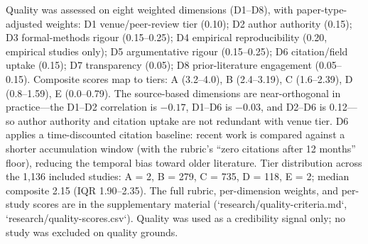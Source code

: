 Quality was assessed on eight weighted dimensions (D1--D8), with paper-type-adjusted weights: D1 venue/peer-review tier (0.10); D2 author authority (0.15); D3 formal-methods rigour (0.15--0.25); D4 empirical reproducibility (0.20, empirical studies only); D5 argumentative rigour (0.15--0.25); D6 citation/field uptake (0.15); D7 transparency (0.05); D8 prior-literature engagement (0.05--0.15). Composite scores map to tiers: A (3.2--4.0), B (2.4--3.19), C (1.6--2.39), D (0.8--1.59), E (0.0--0.79). The source-based dimensions are near-orthogonal in practice---the D1--D2 correlation is $-0.17$, D1--D6 is $-0.03$, and D2--D6 is 0.12---so author authority and citation uptake are not redundant with venue tier. D6 applies a time-discounted citation baseline: recent work is compared against a shorter accumulation window (with the rubric's ``zero citations after 12 months'' floor), reducing the temporal bias toward older literature. Tier distribution across the 1,136 included studies: A = 2, B = 279, C = 735, D = 118, E = 2; median composite 2.15 (IQR 1.90--2.35). The full rubric, per-dimension weights, and per-study scores are in the supplementary material (`research/quality-criteria.md`, `research/quality-scores.csv`). Quality was used as a credibility signal only; no study was excluded on quality grounds.


